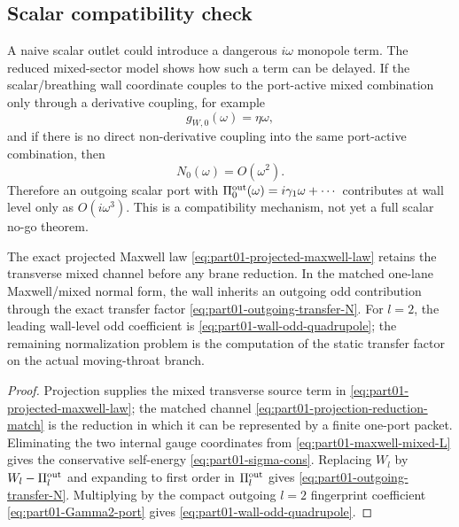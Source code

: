 \subsection{Scalar compatibility check}
\label{subsec:part01-scalar-compatibility}

A naive scalar outlet could introduce a dangerous \(i\omega\) monopole term.  The reduced mixed-sector model shows how such a term can be delayed.  If the scalar/breathing wall coordinate couples to the port-active mixed combination only through a derivative coupling, for example
\begin{equation}
g_{W,0}(\omega)=\eta\omega,
\end{equation}
and if there is no direct non-derivative coupling into the same port-active combination, then
\begin{equation}
N_0(\omega)=O(\omega^2).
\end{equation}
Therefore an outgoing scalar port with \(\Pi_0^{\rm out}(\omega)=i\gamma_1\omega+\cdots\) contributes at wall level only as \(O(i\omega^3)\).  This is a compatibility mechanism, not yet a full scalar no-go theorem.

\begin{theorem}
\label{thm:part01-maxwell-mixed-bridge}
The exact projected Maxwell law \eqref{eq:part01-projected-maxwell-law} retains the transverse mixed channel before any brane reduction.  In the matched one-lane Maxwell/mixed normal form, the wall inherits an outgoing odd contribution through the exact transfer factor \eqref{eq:part01-outgoing-transfer-N}.  For \(l=2\), the leading wall-level odd coefficient is \eqref{eq:part01-wall-odd-quadrupole}; the remaining normalization problem is the computation of the static transfer factor on the actual moving-throat branch.
\end{theorem}

\begin{proof}
Projection supplies the mixed transverse source term in \eqref{eq:part01-projected-maxwell-law}; the matched channel \eqref{eq:part01-projection-reduction-match} is the reduction in which it can be represented by a finite one-port packet.  Eliminating the two internal gauge coordinates from \eqref{eq:part01-maxwell-mixed-L} gives the conservative self-energy \eqref{eq:part01-sigma-cons}.  Replacing \(W_l\) by \(W_l-\Pi_l^{\rm out}\) and expanding to first order in \(\Pi_l^{\rm out}\) gives \eqref{eq:part01-outgoing-transfer-N}.  Multiplying by the compact outgoing \(l=2\) fingerprint coefficient \eqref{eq:part01-Gamma2-port} gives \eqref{eq:part01-wall-odd-quadrupole}.
\end{proof}

